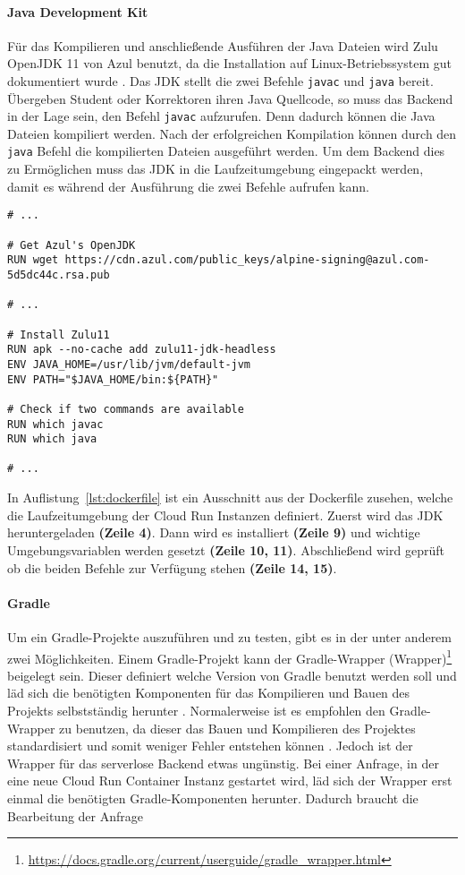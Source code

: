 \paragraph{Java Development Kit} Für das Kompilieren und anschließende Ausführen der Java Dateien wird
Zulu OpenJDK 11 von Azul benutzt, da die Installation auf
Linux-Betriebssystem gut dokumentiert wurde \cite{AzulZuluJDK}.
Das JDK stellt die zwei Befehle \texttt{javac} und \texttt{java} bereit.
Übergeben Student oder Korrektoren ihren Java Quellcode, so muss das Backend in der Lage
sein, den Befehl \texttt{javac} aufzurufen. Denn dadurch können die Java Dateien kompiliert werden.
Nach der erfolgreichen Kompilation können durch den \texttt{java} Befehl die kompilierten Dateien
ausgeführt werden.
Um dem Backend dies zu Ermöglichen muss das JDK in die Laufzeitumgebung eingepackt werden,
damit es während der Ausführung die zwei Befehle aufrufen kann.\\

\begin{lstlisting}[caption={Ausschnitt aus der Dockerfile mit JDK}, label={lst:dockerfile}]
# ... 

# Get Azul's OpenJDK
RUN wget https://cdn.azul.com/public_keys/alpine-signing@azul.com-5d5dc44c.rsa.pub

# ...

# Install Zulu11
RUN apk --no-cache add zulu11-jdk-headless
ENV JAVA_HOME=/usr/lib/jvm/default-jvm
ENV PATH="$JAVA_HOME/bin:${PATH}"

# Check if two commands are available
RUN which javac
RUN which java

# ...
\end{lstlisting}

In Auflistung~\ref{lst:dockerfile} ist ein Ausschnitt
aus der Dockerfile zusehen, welche die Laufzeitumgebung
der Cloud Run Instanzen definiert. Zuerst wird das JDK
heruntergeladen \textbf{(Zeile 4)}. Dann wird es
installiert \textbf{(Zeile 9)} und wichtige Umgebungsvariablen
werden gesetzt \textbf{(Zeile 10, 11)}.
Abschließend wird geprüft ob die beiden Befehle
zur Verfügung stehen \textbf{(Zeile 14, 15)}.

\paragraph{Gradle} Um ein Gradle-Projekte auszuführen und zu testen,
gibt es in der unter anderem zwei Möglichkeiten. Einem Gradle-Projekt
kann der Gradle-Wrapper (Wrapper)\footnote{\url{https://docs.gradle.org/current/userguide/gradle_wrapper.html}}
beigelegt sein. Dieser definiert welche Version von Gradle benutzt
werden soll und läd sich die benötigten Komponenten für das Kompilieren
und Bauen des Projekts selbstständig herunter \cite{GradleWrapper}.
Normalerweise ist es empfohlen den Gradle-Wrapper zu benutzen,
da dieser das Bauen und Kompilieren des Projektes standardisiert und
somit weniger Fehler entstehen können \cite{GradleWrapper}.
Jedoch ist der Wrapper für das serverlose Backend etwas ungünstig.
Bei einer Anfrage, in der eine neue Cloud Run Container Instanz
gestartet wird, läd sich der Wrapper erst einmal die benötigten
Gradle-Komponenten herunter. Dadurch braucht die Bearbeitung der
Anfrage



